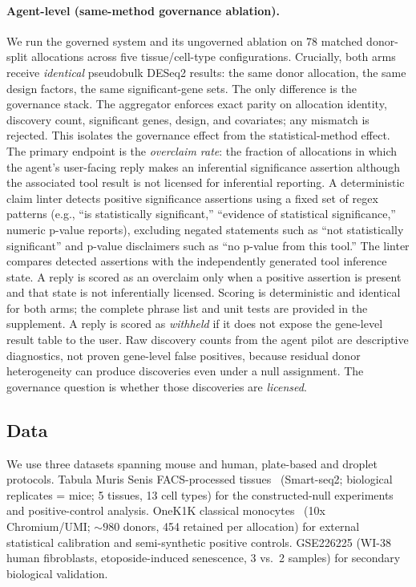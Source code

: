 \documentclass[pmlr,twocolumn,10pt]{jmlr}
\begin{document}
\paragraph{Agent-level (same-method governance ablation).}
We run the governed system and its ungoverned ablation on 78 matched
donor-split allocations across five tissue/cell-type configurations.
Crucially, both arms receive \textit{identical} pseudobulk DESeq2 results:
the same donor allocation, the same design factors, the same significant-gene
sets. The only difference is the governance stack. The aggregator enforces
exact parity on allocation identity, discovery count, significant genes,
design, and covariates; any mismatch is rejected. This isolates the governance
effect from the statistical-method effect. The primary endpoint is
the \textit{overclaim rate}: the fraction of allocations in which the agent's
user-facing reply makes an inferential significance assertion although the
associated tool result is not licensed for inferential reporting. A
deterministic claim linter detects positive significance assertions using a
fixed set of regex patterns (e.g., ``is statistically significant,'' ``evidence
of statistical significance,'' numeric p-value reports), excluding negated
statements such as ``not statistically significant'' and p-value disclaimers
such as ``no p-value from this tool.'' The linter compares detected assertions
with the independently generated tool inference state. A reply is scored as an
overclaim only when a positive assertion is present and that state is not
inferentially licensed. Scoring is deterministic and identical for both
arms; the complete phrase list and unit tests are provided in the
supplement. A reply is scored as
\textit{withheld} if it does not expose the gene-level result table to the user.
Raw discovery counts from the agent pilot are descriptive diagnostics, not
proven gene-level false positives, because residual donor heterogeneity can
produce discoveries even under a null assignment. The governance question is
whether those discoveries are \textit{licensed}.

\subsection{Data}

We use three datasets spanning mouse and human, plate-based and droplet
protocols. Tabula Muris Senis FACS-processed tissues~\citep{tabulamuris2020}
(Smart-seq2; biological replicates = mice; 5 tissues, 13 cell types) for the
constructed-null experiments and positive-control analysis. OneK1K classical
monocytes~\citep{yazar2022} (10x Chromium/UMI; ${\sim}980$ donors, 454
retained per allocation) for external statistical calibration and
semi-synthetic positive controls. GSE226225 (WI-38 human fibroblasts,
etoposide-induced senescence, 3 vs.\ 2 samples) for secondary biological
validation.
\end{document}

